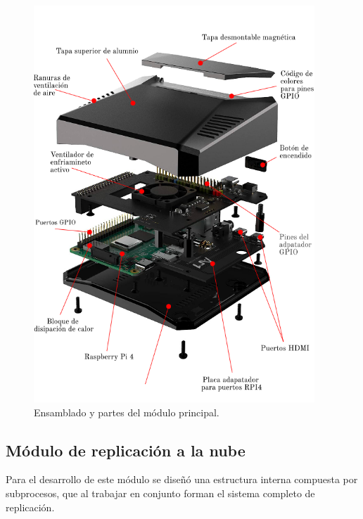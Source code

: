 \begin{figure}[htpb]
\centering 
\includegraphics[width=0.94\textwidth]{./Figures/armadoactuador.png}
\caption{Ensamblado y partes del módulo principal. }
\label{fig:argon}
\end{figure}


\subsection{Módulo de replicación a la nube}

Para el desarrollo de este módulo se diseñó una estructura interna compuesta por subprocesos, que al trabajar en conjunto forman el sistema completo de replicación.

